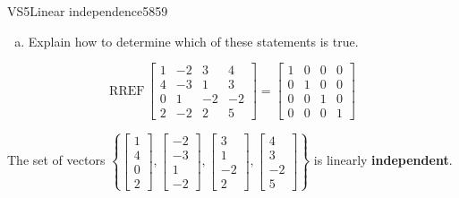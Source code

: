 \begin{exercise}{VS5}{Linear independence}{5859}
\begin{exerciseStatement}
\begin{enumerate}[(a)]
\begin{itemize}
 
\end{itemize}

     
\item  

 Explain how to determine which of these statements is true. 

 
\end{enumerate}

     \end{exerciseStatement}
 \begin{exerciseAnswer} 

 \[
\mathrm{RREF}\, \left[\begin{array}{cccc}
1 & -2 & 3 & 4 \\
4 & -3 & 1 & 3 \\
0 & 1 & -2 & -2 \\
2 & -2 & 2 & 5
\end{array}\right] = \left[\begin{array}{cccc}
1 & 0 & 0 & 0 \\
0 & 1 & 0 & 0 \\
0 & 0 & 1 & 0 \\
0 & 0 & 0 & 1
\end{array}\right]
            \] 

 

 The set of vectors \(\left\{ \left[\begin{array}{c}
1 \\
4 \\
0 \\
2
\end{array}\right] , \left[\begin{array}{c}
-2 \\
-3 \\
1 \\
-2
\end{array}\right] , \left[\begin{array}{c}
3 \\
1 \\
-2 \\
2
\end{array}\right] , \left[\begin{array}{c}
4 \\
3 \\
-2 \\
5
\end{array}\right] \right\}\) is linearly \textbf{independent}. 

 \end{exerciseAnswer}
 \end{exercise}


